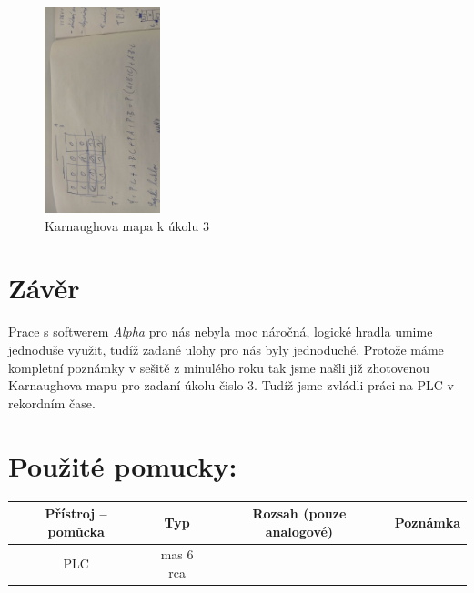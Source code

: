 \documentclass[a4paper]{article}
\begin{document}
\begin{figure}[H]
	\centering
	\includegraphics[width=0.3\textwidth, angle=270]{foto2.jpg}
	\caption{Karnaughova mapa k úkolu 3}
	\label{fig:foto2}
\end{figure}

\section*{Závěr}
Prace s softwerem \textit{Alpha} pro nás nebyla moc náročná, logické hradla umime jednoduše využit, tudíž zadané ulohy pro nás byly jednoduché. Protože máme kompletní poznámky v sešitě z minulého roku tak jsme našli již zhotovenou Karnaughova mapu pro zadaní úkolu čislo 3. Tudíž jsme zvládli práci na PLC v rekordním čase.
\vfill
\section*{Použité pomucky:}
\begin{tabularx}{\linewidth}{c|c|c|c}
	Přístroj – pomůcka & Typ & Rozsah (pouze analogové)
	& Poznámka \\
	\hline
	PLC & mas 6 rca & &
\end{tabularx}
\end{document}
